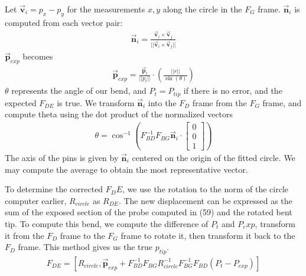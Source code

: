 \documentclass[letterpaper, 11pt]{article}
\newcommand{\vect}[1]{\boldsymbol{\vec #1}}
\renewcommand{\sin}[1]{\operatorname{sin}\left( #1 \right)}
\newcommand{\cosinv}[1]{\operatorname{cos}^{-1}\left( #1 \right)}
\begin{document}
Let $\vect v_i = p_x - p_y$ for the measurements $x,y$ along the circle in the $F_G$ frame. $\vect n_i$ is computed from each vector pair:
\begin{align}
\vect n_i = \frac{\vect v_i \times \vect v_j}{||\vect v_i \times \vect v_j ||}
\end{align}
$\vect p_{exp}$ becomes
\begin{align}
\vect p_{exp} = \frac{\vect p_t}{||p_t||}\cdot\left(\frac{||r||}{\sin{\theta}}\right)
\end{align}
$\theta$ represents the angle of our bend, and $P_t = P_{tip}$ if there is no error, and the expected $F_{DE}$ is true. We transform $\vect n_i$ into the $F_D$ frame from the $F_G$ frame, and compute theta using the dot product of the normalized vectors
\begin{align}
\theta = \cosinv{F_{BD}^{-1}F_{BG}\vect n_i \cdot\begin{bmatrix} 0 \\ 0 \\ 1 \end{bmatrix}}
\end{align}
The axis of the pins is given by $\vect n_i$ centered on the origin of the fitted circle. We may compute the average to obtain the most representative vector. 

To determine the corrected $F_DE$, we use the rotation to the norm of the circle computer earlier, $R_{circle}$ as $R_{DE}$. The new displacement can be expressed as the sum of the exposed section of the probe computed in (59) and the rotated bent tip. To compute this bend, we compute the difference of $P_t$ and $P_exp$, transform it from the $F_D$ frame to the $F_G$ frame to rotate it, then transform it back to the $F_D$ frame. This method gives us the true $p_{tip}$.
\begin{align}
F_{DE} = [R_{circle}, \vect p_{exp} + F_{BD}^{-1} F_{BG}R_{circle}^{-1} F_{BG}^{-1}F_{BD}(P_t - P_{exp})]
\end{align}


\end{document}
